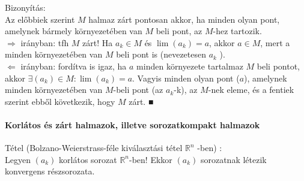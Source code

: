 \documentclass[]{scrartcl}
\let\oldparagraph\paragraph
\renewcommand{\paragraph}[1]{\oldparagraph{#1}\mbox{}}
\newenvironment{tetel}{}{}
\newenvironment{bizonyitas}{}{}
\begin{document}
\begin{bizonyitas}

Bizonyítás:\\
Az előbbiek szerint \(M\) halmaz zárt pontosan akkor, ha minden olyan
pont, amelynek bármely környezetében van \(M\) beli pont, az \(M\)-hez
tartozik.\\
\(\Rightarrow\) irányban: tfh \(M\) zárt! Ha \(a_{k} \in M\) és
\(\lim\left( a_{k} \right) = a\), akkor \(a \in M\), mert a minden
környezetében van \(M\) beli pont is (nevezetesen \(a_{k}\) ).\\
\(\Leftarrow\) irányban: fordítva is igaz, ha \(a\) minden környezete
tartalmaz \(M\) beli pontot, akkor
\(\exists\left( a_{k} \right) \in M:\lim\left( a_{k} \right) = a\).
Vagyis minden olyan pont (\(a\)), amelynek minden környezetében van
\(M\)-beli pont (az \(a_{k}\)-k), az \(M\)-nek eleme, és a fentiek
szerint ebből következik, hogy \(M\) zárt. ■

\end{bizonyitas}

\paragraph{Korlátos és zárt halmazok, illetve sorozatkompakt
halmazok}\label{korluxe1tos-uxe9s-zuxe1rt-halmazok-illetve-sorozatkompakt-halmazok}

\begin{tetel}

Tétel (Bolzano-Weierstrass-féle kiválasztási tétel \({\mathbb{R}}^{n}\)
-ben) :\\
Legyen \(\left( a_{k} \right)\) korlátos sorozat
\({\mathbb{R}}^{n}\)-ben! Ekkor \(\left( a_{k} \right)\) sorozatnak
létezik konvergens részsorozata.

\end{tetel}
\end{document}
